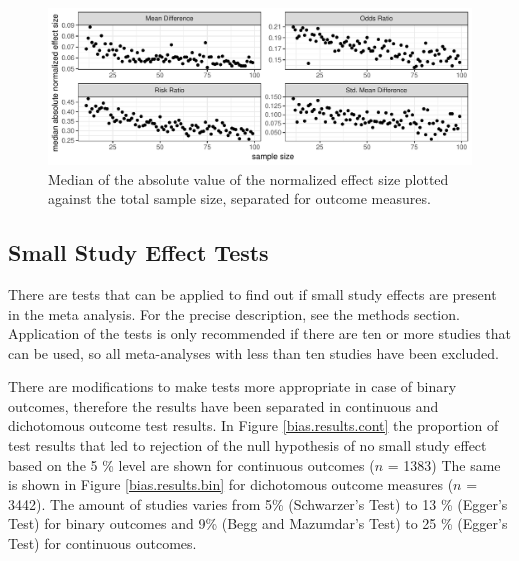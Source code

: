 \documentclass[11pt,a4paper,twoside]{book}\usepackage[]{graphicx}\usepackage[]{color}
\newenvironment{knitrout}{}{} %
\begin{document}
\begin{figure}
\begin{knitrout}
\color{fgcolor}

{\centering \includegraphics[width=\textwidth-3cm]{figure/ch02_figunnamed-chunk-17-1} 

}



\end{knitrout}
\caption{Median of the absolute value of the normalized effect size plotted against the total sample size, separated for outcome measures.}
\label{effect.samplesize.separated}
\end{figure}





\subsection{Small Study Effect Tests}



There are tests that can be applied to find out if small study effects are present in the meta analysis. For the precise description, see the methods section. Application of the tests is only recommended if there are ten or more studies \citep{cochrane.handbook} that can be used, so all meta-analyses with less than ten studies have been excluded.

\vspace{0mm}
There are modifications to make tests more appropriate in case of binary outcomes, therefore the results have been separated in continuous and dichotomous outcome test results. In Figure \ref{bias.results.cont} the proportion of test results that led to rejection of the null hypothesis of no small study effect based on the 5 \% level are shown for continuous outcomes ($n$ = 1383)
The same is shown in Figure \ref{bias.results.bin} for dichotomous outcome measures ($n$ = 3442). The amount of studies varies from 5\% (Schwarzer's Test) to 13 \% (Egger's Test) for binary outcomes and 9\% (Begg and Mazumdar's Test) to 25 \% (Egger's Test) for continuous outcomes. 
\end{document}
